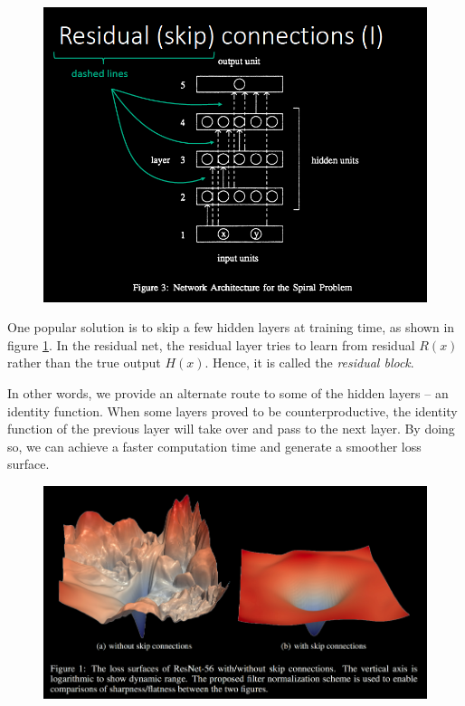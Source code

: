 \begin{figure}[ht]
    \centering
    \includegraphics[scale=0.3]{figs/skip_connection.png}
    \caption{}
    \label{05}
\end{figure}

One popular solution is to skip a few hidden layers at training time, as shown in figure \ref{05}. In the residual net, the residual layer tries to learn from residual $R(x)$ rather than the true output $H(x)$. Hence, it is called the \textit{residual block}.

In other words, we provide an alternate route to some of the hidden layers -- an identity function. When some layers proved to be counterproductive, the identity function of the previous layer will take over and pass to the next layer. By doing so, we can achieve a faster computation time and generate a smoother loss surface.

\begin{figure}[!htb]
    \centering
    \includegraphics[scale=0.3]{figs/with_and_without_skip.png}
\end{figure}

